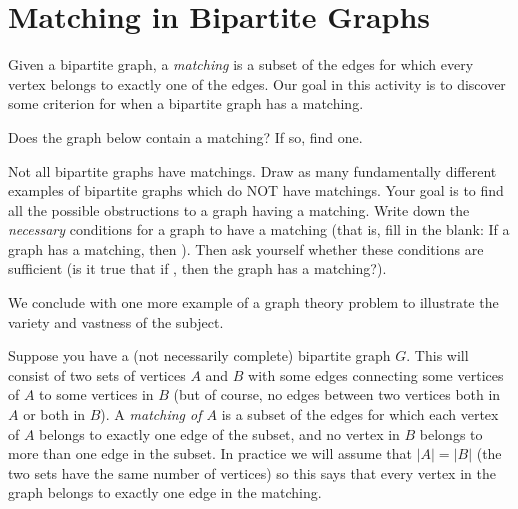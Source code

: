 \documentclass[12pt]{article}
\begin{document}
\section{Matching in Bipartite Graphs}\label{sec:matchings}

\begin{activity}
\noindent Given a bipartite graph, a {\em matching} is a subset of the edges for which every vertex belongs to exactly one of the edges.  Our goal in this activity is to discover some criterion for when a bipartite graph has a matching.

\begin{questions}
\question Does the graph below contain a matching?  If so, find one.

\begin{center}
\end{center}


\question Not all bipartite graphs have matchings.  Draw as many fundamentally different examples of bipartite graphs which do NOT have matchings.  Your goal is to find all the possible obstructions to a graph having a matching.  Write down the {\em necessary} conditions for a graph to have a matching (that is, fill in the blank: If a graph has a matching, then \underline{\hspace{1in}}).  Then ask yourself whether these conditions are sufficient (is it true that if \underline{\hspace{1in}}, then the graph has a matching?).




\end{questions}

\end{activity}


We conclude with one more example of a graph theory problem to illustrate the variety and vastness of the subject.

Suppose you have a (not necessarily complete) bipartite graph $G$.  This will consist of two sets of vertices $A$ and $B$ with some edges connecting some vertices of $A$ to some vertices in $B$ (but of course, no edges between two vertices both in $A$ or both in $B$).  A {\em matching of $A$} is a subset of the edges for which each vertex of $A$ belongs to exactly one edge of the subset, and no vertex in $B$ belongs to more than one edge in the subset.  In practice we will assume that $|A| = |B|$ (the two sets have the same number of vertices) so this says that every vertex in the graph belongs to exactly one edge in the matching.
\end{document}

